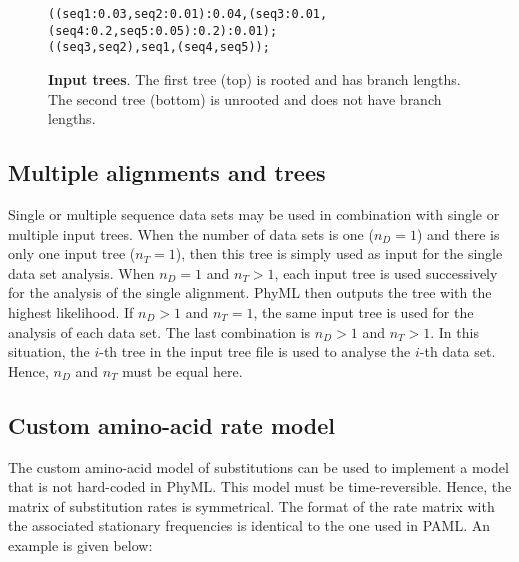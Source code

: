 \documentclass[a4paper,12pt]{article}
\begin{document}
\begin{figure}[h]
\begin{small}
\begin{minipage}{\textwidth}
\begin{verbatim}
((seq1:0.03,seq2:0.01):0.04,(seq3:0.01,(seq4:0.2,seq5:0.05):0.2):0.01);
((seq3,seq2),seq1,(seq4,seq5));
\end{verbatim}
\end{minipage}
\end{small}
\caption{{\bf Input trees}. The first tree (top) is rooted and has branch lengths. The second tree
  (bottom) is unrooted and does not have branch lengths.}
\label{fig:trees}
\end{figure}


\subsection{Multiple alignments and trees}

Single or  multiple sequence  data sets may  be used  in combination with  single or  multiple input
trees. When the number of data sets is one ($n_D = 1$) and there is only one input tree ($n_T = 1$),
then this tree is simply  used as input for the single data set analysis. When  $n_D = 1$ and $n_T >
1$,  each input tree  is used  successively for  the analysis  of the  single alignment.  PhyML then
outputs the tree  with the highest likelihood.  If $n_D > 1$ and  $n_T = 1$, the same  input tree is
used for the analysis  of each data set.  The last  combination is $n_D > 1$ and $n_T  > 1$. In this
situation, the  $i$-th tree in the input  tree file is used  to analyse the $i$-th  data set. Hence,
$n_D$ and $n_T$ must be equal here.


\subsection{Custom amino-acid rate model}\label{sec:customaa}

The custom amino-acid model of substitutions can be  used to implement a model that is not hard-coded
in  PhyML.  This  model  must  be  time-reversible.  Hence, the  matrix  of  substitution  rates  is
symmetrical. The format  of the rate matrix with the associated  stationary frequencies is identical
to the one used in PAML. An example is given below:
\end{document}
